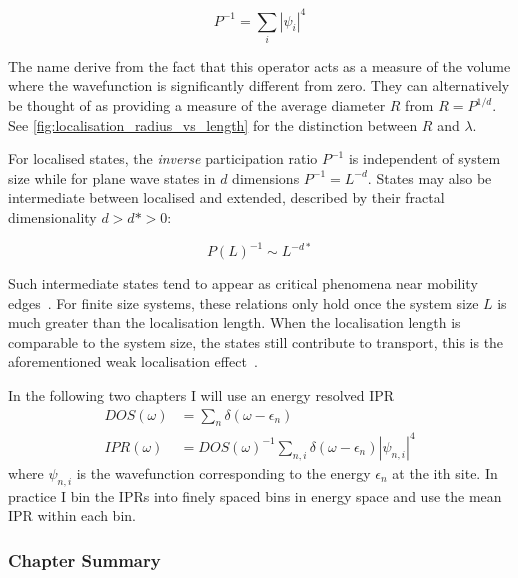 \[
P^{-1} = \sum_i |\psi_i|^4
\]

The name derive from the fact that this operator acts as a measure of the volume where the wavefunction is significantly different from zero. They can alternatively be thought of as providing a measure of the average diameter \(R\) from \(R = P^{1/d}\). See \cref{fig:localisation_radius_vs_length} for the distinction between \(R\) and \(\lambda\).

For localised states, the \emph{inverse} participation ratio \(P^{-1}\) is independent of system size while for plane wave states in \(d\) dimensions \(P^{-1} = L^{-d}\). States may also be intermediate between localised and extended, described by their fractal dimensionality \(d > d* > 0\):

\[
P(L)^{-1} \sim L^{-d*} 
\]

Such intermediate states tend to appear as critical phenomena near mobility edges~\autocite{eversAndersonTransitions2008}. For finite size systems, these relations only hold once the system size \(L\) is much greater than the localisation length. When the localisation length is comparable to the system size, the states still contribute to transport, this is the aforementioned weak localisation effect~\autocite{altshulerMagnetoresistanceHallEffect1980,dattaElectronicTransportMesoscopic1995}.

In the following two chapters I will use an energy resolved IPR \[
\begin{aligned}
DOS(\omega) &= \sum_n \delta(\omega - \epsilon_n)\\
IPR(\omega) &= DOS(\omega)^{-1} \sum_{n,i} \delta(\omega - \epsilon_n) |\psi_{n,i}|^4
\end{aligned}
\] where \(\psi_{n,i}\) is the wavefunction corresponding to the energy \(\epsilon_n\) at the ith site. In practice I bin the IPRs into finely spaced bins in energy space and use the mean IPR within each bin.

\hypertarget{chapter-summary}{%
\subsubsection{Chapter Summary}\label{chapter-summary}}

